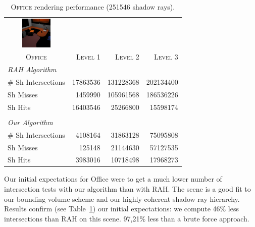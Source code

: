 \documentclass{egpubl}
\begin{document}
\begin{table}[!htb]
\begin{center}
\fontsize{7}{9}
\selectfont
\begin{tabular}{l|rrr}
    \multicolumn{1}{c}{\includegraphics[width=1.5cm]{images/office}} & & \\
    \multicolumn{1}{c|}{\textsc{Office}} & \textsc{Level 1} & \textsc{Level 2} & \textsc{Level 3}\\
    \hline
    \emph{RAH Algorithm} & & \\
    \hline
    \quad \# Sh Intersections  & 17863536	 & 131228368    & 202134400  \\
    \quad Sh Misses            & 1459990	 & 105961568    & 186536226	 \\
    \quad Sh Hits              & 16403546	 & 25266800	    & 15598174	 \\

    & & \\

    \hline
    \emph{Our Algorithm} & & \\
    \hline
    \quad \# Sh Intersections   & 4108164	     & 31863128	    & 75095808	 \\
    \quad Sh Misses    & 125148		 & 21144630	    & 57127535	 \\
    \quad Sh Hits & 3983016		 & 10718498	    & 17968273	 \\
\end{tabular}
\end{center}
\caption{\label{table:office-results}
\textsc{Office} rendering performance (251546 shadow rays).}
\end{table}

Our initial expectations for Office were to get a much lower number of intersection tests with our algorithm than with RAH. The scene is a good fit to our bounding volume scheme and our highly coherent shadow ray hierarchy. Results confirm (see Table~\ref{table:office-results}) our initial expectations: we compute 46\% less intersections than RAH on this scene. 97,21\% less than a brute force approach.
\end{document}
